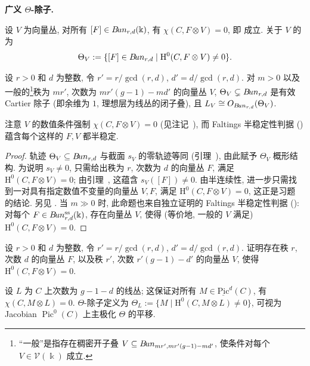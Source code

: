 \textbf{广义 $\Theta$-除子.}
\begin{definition}\label{src:9.4.24}
设 $V$ 为向量丛, 对所有 $[F]\in B\!un_{r,d}(\Bbbk)$, 有 $\chi(C,F\otimes V)=0$, 即  成立. 关于 $V$ 的 为
\[
\Theta_V:=\{[F]\in B\!un_{r,d}\mid\mathrm H^0(C,F\otimes V)\ne0\}.
\]
\end{definition}
\begin{proposition}\label{src:9.4.25}
设 $r>0$ 和 $d$ 为整数, 令 $r'=r/\gcd(r,d)$, $d'=d/\gcd(r,d)$. 对 $m>0$ 以及一般的\footnote{``一般''是指存在稠密开子叠 $V\subseteq B\!un_{mr',mr'(g-1)-md'}$, 使条件对每个 $V\in\mathcal V(\Bbbk)$ 成立.}秩为 $mr'$, 次数为 $mr'(g-1)-md'$ 的向量丛 $V$, $\Theta_V\subsetneq B\!un_{r,d}$ 是有效 Cartier 除子 (即余维为 $1$, 理想层为线丛的闭子叠), 且 $L_V\cong O_{B\!un_{r,d}}(\Theta_V)$.
\end{proposition}
\begin{remark}\label{src:9.4.26}
注意 $V$ 的数值条件强制 $\chi(C,F\otimes V)=0$ (见注记~), 而 Faltings 半稳定性判据 () 蕴含每个这样的 $F,V$ 都半稳定.
\end{remark}
\begin{proof}
轨迹 $\Theta_V\subseteq B\!un_{r,d}$ 与截面 $s_V$ 的零轨迹等同 (引理~), 由此赋予 $\Theta_V$ 概形结构. 为说明 $s_V\ne0$, 只需给出秩为 $r$, 次数为 $d$ 的向量丛 $F$, 满足 $\mathrm H^0(C,F\otimes V)=0$; 由引理~, 这蕴含 $s_V([F])\ne0$. 由半连续性, 进一步只需找到一对具有指定数值不变量的向量丛 $V,F$, 满足 $\mathrm H^0(C,F\otimes V)=0$, 这正是习题~ 的结论. 另见 \cite{Hir88,Ghi84}. 当 $m\gg0$ 时, 此命题也来自独立证明的 Faltings 半稳定性判据 (): 对每个 $F\in B\!un_{r,d}^{\mathrm{ss}}(\Bbbk)$, 存在向量丛 $V$, 使得 (等价地, 一般的 $V$ 满足) $\mathrm H^0(C,F\otimes V)=0$.
\end{proof}
\begin{exercise}[困难]\label{src:9.4.27}
设 $r>0$ 和 $d$ 为整数, 令 $r'=r/\gcd(r,d)$, $d'=d/\gcd(r,d)$. 证明存在秩 $r$, 次数 $d$ 的向量丛 $F$, 以及秩 $r'$, 次数 $r'(g-1)-d'$ 的向量丛 $V$, 使得 $\mathrm H^0(C,F\otimes V)=0$.
\end{exercise}
\begin{remark}\label{src:9.4.28}
设 $L$ 为 $C$ 上次数为 $g-1-d$ 的线丛; 这保证对所有 $M\in\underline{\mathrm{Pic}}^d(C)$, 有 $\chi(C,M\otimes L)=0$. $\Theta$-除子定义为 $\Theta_L:=\{M\mid\mathrm H^0(C,M\otimes L)\ne0\}$, 可视为 Jacobian $\operatorname{Pic}^0(C)$ 上主极化 $\Theta$ 的平移.
\end{remark}
